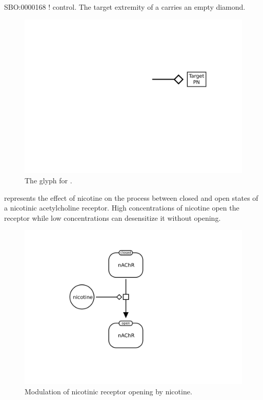 \begin{glyphDescription}
 \glyphSboTerm SBO:0000168 ! control.
 \glyphEndPoint The target extremity of a  carries an empty diamond.
 \end{glyphDescription}

\begin{figure}[htb]
  \centering
  \includegraphics[scale = 0.5]{images/modulation}
  \caption{The \PD glyph for .}
  \label{fig:techref:modulation}
\end{figure}

 represents the effect of nicotine on the process between closed and open states of a nicotinic acetylcholine receptor. High concentrations of nicotine open the receptor while low concentrations can desensitize it without opening.

\begin{figure}[htb]
  \centering
  \includegraphics[scale = 0.5]{examples/modulation-nAChR}
  \caption{Modulation of nicotinic receptor opening by nicotine.}
  \label{fig:techref:modul-nico}
\end{figure}


